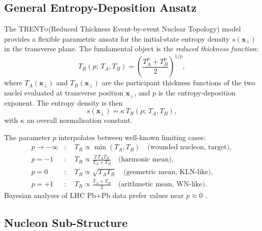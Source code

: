 \documentclass[12pt,a4paper,twoside]{report}
\newcommand{\trento}{\textsc{TRENTo}\xspace}
\begin{document}
\subsection{General Entropy-Deposition Ansatz}
\label{subsec:trento_ansatz}

The \trento (Reduced Thickness Event-by-event Nuclear Topology) model
\cite{Moreland2015} provides a flexible parametric ansatz for the
initial-state entropy density $s(\bm{x}_\perp)$ in the transverse
plane.  The fundamental object is the \emph{reduced thickness function}:
\begin{equation}
  T_R(p;\, T_A, T_B)
  = \left(\frac{T_A^p + T_B^p}{2}\right)^{1/p},
  \label{eq:TR_general}
\end{equation}
where $T_A(\bm{x}_\perp)$ and $T_B(\bm{x}_\perp)$ are the participant
thickness functions of the two nuclei evaluated at transverse position
$\bm{x}_\perp$, and $p$ is the entropy-deposition exponent.
The entropy density is then
\begin{equation}
  s(\bm{x}_\perp) = \kappa\, T_R(p;\, T_A, T_B),
  \label{eq:trento_entropy}
\end{equation}
with $\kappa$ an overall normalisation constant.

The parameter $p$ interpolates between well-known limiting cases:
\begin{align}
  p \to -\infty &:\quad T_R \propto \min(T_A, T_B) \quad \text{(wounded nucleon, target)}, \\
  p = -1         &:\quad T_R \propto \frac{2\, T_A T_B}{T_A + T_B} \quad \text{(harmonic mean)}, \\
  p = 0          &:\quad T_R \propto \sqrt{T_A T_B} \quad \text{(geometric mean, KLN-like)}, \\
  p = +1         &:\quad T_R \propto \frac{T_A + T_B}{2} \quad \text{(arithmetic mean, WN-like)}.
  \label{eq:trento_limits}
\end{align}
Bayesian analyses of LHC Pb+Pb data prefer values near $p \approx 0$
\cite{Bernhard2019,Nijs2021}.

\subsection{Nucleon Sub-Structure}
\label{subsec:trento_nucleon}
\end{document}
